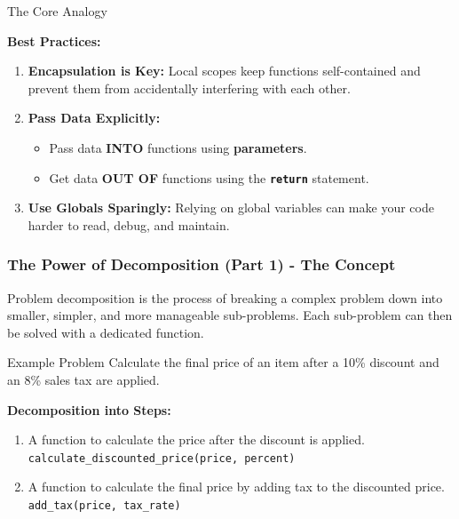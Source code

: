 \documentclass{beamer}
\begin{document}
\begin{frame}[fragile]
\begin{block}{The Core Analogy}
\begin{frame}[fragile]
    \textbf{Best Practices:}
    \begin{enumerate}
        \item \textbf{Encapsulation is Key:} Local scopes keep functions self-contained and prevent them from accidentally interfering with each other.
        \item \textbf{Pass Data Explicitly:}
        \begin{itemize}
            \item Pass data \textbf{INTO} functions using \textbf{parameters}.
            \item Get data \textbf{OUT OF} functions using the \textbf{\texttt{return}} statement.
        \end{itemize}
        \item \textbf{Use Globals Sparingly:} Relying on global variables can make your code harder to read, debug, and maintain.
    \end{enumerate}
    
\end{frame}

\begin{frame}
    \frametitle{The Power of Decomposition (Part 1) - The Concept}
    
    Problem decomposition is the process of breaking a complex problem down into smaller, simpler, and more manageable sub-problems. Each sub-problem can then be solved with a dedicated function.
    
    \begin{block}{Example Problem}
        Calculate the final price of an item after a 10\% discount and an 8\% sales tax are applied.
    \end{block}
    
    \textbf{Decomposition into Steps:}
    \begin{enumerate}
        \item A function to calculate the price after the discount is applied.\\
        \texttt{calculate\_discounted\_price(price, percent)}
        
        \vspace{0.5cm}
        
        \item A function to calculate the final price by adding tax to the discounted price.\\
        \texttt{add\_tax(price, tax\_rate)}
    \end{enumerate}
    

\end{frame}
\end{block}
\end{frame}
\end{document}
